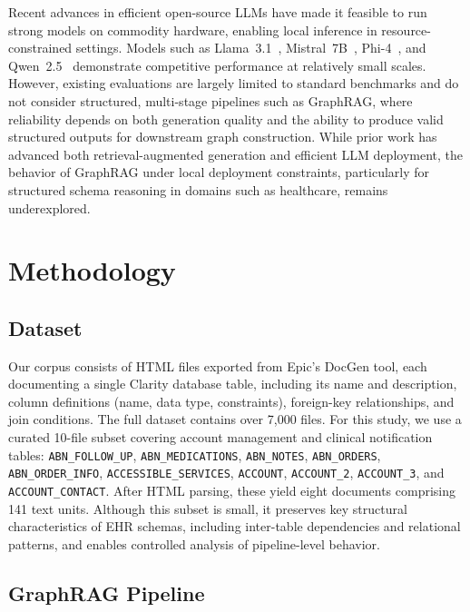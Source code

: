 \documentclass{article}
\begin{document}
Recent advances in efficient open-source LLMs have made it feasible to run strong models on commodity hardware, enabling local inference in resource-constrained settings. Models such as Llama~3.1~\cite{grattafiori2024llama}, Mistral~7B~\cite{jiang20236g}, Phi-4~\cite{abdin2024phi}, and Qwen~2.5~\cite{yang2025qwen3} demonstrate competitive performance at relatively small scales. However, existing evaluations are largely limited to standard benchmarks and do not consider structured, multi-stage pipelines such as GraphRAG, where reliability depends on both generation quality and the ability to produce valid structured outputs for downstream graph construction. While prior work has advanced both retrieval-augmented generation and efficient LLM deployment, the behavior of GraphRAG under local deployment constraints, particularly for structured schema reasoning in domains such as healthcare, remains underexplored.

\section{Methodology}
\label{sec:method}

\subsection{Dataset}

Our corpus consists of HTML files exported from Epic's DocGen tool, each documenting a single Clarity database table, including its name and description, column definitions (name, data type, constraints), foreign-key relationships, and join conditions. The full dataset contains over 7{,}000 files. For this study, we use a curated 10-file subset covering account management and clinical notification tables: \texttt{ABN\_FOLLOW\_UP}, \texttt{ABN\_MEDICATIONS}, \texttt{ABN\_NOTES}, \texttt{ABN\_ORDERS}, \texttt{ABN\_ORDER\_INFO}, \texttt{ACCESSIBLE\_SERVICES}, \texttt{ACCOUNT}, \texttt{ACCOUNT\_2}, \texttt{ACCOUNT\_3}, and \texttt{ACCOUNT\_CONTACT}. After HTML parsing, these yield eight documents comprising 141 text units. Although this subset is small, it preserves key structural characteristics of EHR schemas, including inter-table dependencies and relational patterns, and enables controlled analysis of pipeline-level behavior.

\subsection{GraphRAG Pipeline}
\end{document}
